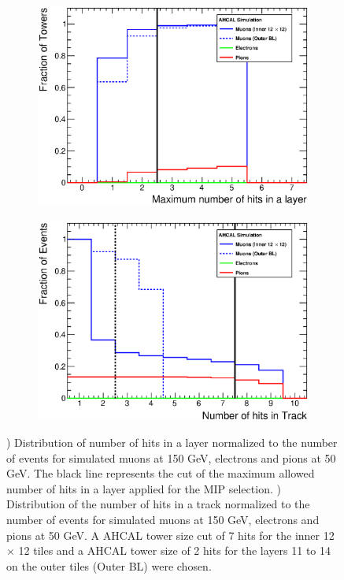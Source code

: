 \begin{figure}[htbp!]
	\begin{subfigure}[t]{0.49\textwidth}
		\centering
		\includegraphics[width=1\linewidth]{../Thesis_Plots/Timing/Muons/Plots/TrackFinderCut_nHitsLayer_Muons.eps}
		\caption{} \label{fig:Muons_Track_nHitsLayer}
	\end{subfigure}
	\hfill
	\begin{subfigure}[t]{0.49\textwidth}
		\centering
		\includegraphics[width=1\linewidth]{../Thesis_Plots/Timing/Muons/Plots/TrackFinderCut_nHitsTrack_Muons.eps}
		\caption{} \label{fig:Muons_Track_nHits}
	\end{subfigure}
	\caption{) Distribution of number of hits in a layer normalized to the number of events for simulated muons at 150 GeV, electrons and pions at 50 GeV. The black line represents the cut of the maximum allowed number of hits in a layer applied for the MIP selection. ) Distribution of the number of hits in a track normalized to the number of events for simulated muons at 150 GeV, electrons and pions at 50 GeV. A AHCAL tower size cut of 7 hits for the inner 12 $\times$ 12 tiles and a AHCAL tower size of 2 hits for the layers 11 to 14 on the outer tiles (Outer BL) were chosen.}
\end{figure}

